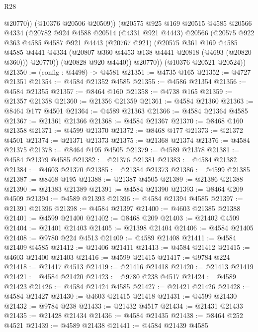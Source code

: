\begin{lexlean}{R28}
\begin{coremodule}
              @20770))
          (@10376 @20506 @20509))
        (@20575
          @925
          @169
          @20515
          @4585
          @20566
          @4334
          (@20782
            @924
            @4588
            @20514
            (@4331 @921 @4443)
            @20566
            (@20575
              @922
              @363
              @4585
              @4587
              @921
              @4443
              (@20767 @921)
              (@20575
                @361
                @169
                @4585
                @4585
                @4441
                @4334
                (@20807 @360 @4453 @138 @4441 @20818 (@4693 (@20820 @360)))
                @20770))
            (@20828 @920 @4440))
          @20770))
      (@10376 @20521 @20524))
@21350 := (config : @4498) -> @4581
@21351 := @4735 @165
@21352 := @4727 @21351
@21354 := @4584 @21352 @4585
@21355 := @4586 @21354
@21356 := @4584 @21355
@21357 := @8464 @160
@21358 := @4738 @165
@21359 := @21357 @21358
@21360 := @21356 @21359
@21361 := @4584 @21360
@21363 := @8464 @177 @4501
@21364 := @4589 @21363
@21366 := @4584 @21364 @4585
@21367 := @21361 @21366
@21368 := @4584 @21367
@21370 := @8468 @160 @21358
@21371 := @4599 @21370
@21372 := @8468 @177
@21373 := @21372 @4501
@21374 := @21371 @21373
@21375 := @21368 @21374
@21376 := @4584 @21375
@21378 := @8464 @195 @4505
@21379 := @4589 @21378
@21381 := @4584 @21379 @4585
@21382 := @21376 @21381
@21383 := @4584 @21382
@21384 := @4603 @21370
@21385 := @21384 @21373
@21386 := @4599 @21385
@21387 := @8468 @195
@21388 := @21387 @4505
@21389 := @21386 @21388
@21390 := @21383 @21389
@21391 := @4584 @21390
@21393 := @8464 @209 @4509
@21394 := @4589 @21393
@21396 := @4584 @21394 @4585
@21397 := @21391 @21396
@21398 := @4584 @21397
@21400 := @4603 @21385 @21388
@21401 := @4599 @21400
@21402 := @8468 @209
@21403 := @21402 @4509
@21404 := @21401 @21403
@21405 := @21398 @21404
@21406 := @4584 @21405
@21408 := @9780 @224 @4513
@21409 := @4589 @21408
@21411 := @4584 @21409 @4585
@21412 := @21406 @21411
@21413 := @4584 @21412
@21415 := @4603 @21400 @21403
@21416 := @4599 @21415
@21417 := @9784 @224
@21418 := @21417 @4513
@21419 := @21416 @21418
@21420 := @21413 @21419
@21421 := @4584 @21420
@21423 := @9780 @238 @4517
@21424 := @4589 @21423
@21426 := @4584 @21424 @4585
@21427 := @21421 @21426
@21428 := @4584 @21427
@21430 := @4603 @21415 @21418
@21431 := @4599 @21430
@21432 := @9784 @238
@21433 := @21432 @4517
@21434 := @21431 @21433
@21435 := @21428 @21434
@21436 := @4584 @21435
@21438 := @8464 @252 @4521
@21439 := @4589 @21438
@21441 := @4584 @21439 @4585

\end{coremodule}
\end{lexlean}
